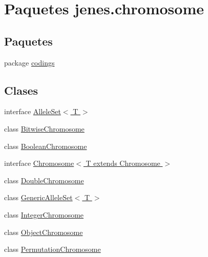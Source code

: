 \hypertarget{namespacejenes_1_1chromosome}{\section{Paquetes jenes.\-chromosome}
\label{namespacejenes_1_1chromosome}
}
\subsection*{Paquetes}
\begin{DoxyCompactItemize}
\item 
package \hyperlink{namespacejenes_1_1chromosome_1_1codings}{codings}
\end{DoxyCompactItemize}
\subsection*{Clases}
\begin{DoxyCompactItemize}
\item 
interface \hyperlink{interfacejenes_1_1chromosome_1_1_allele_set_3_01_t_01_4}{Allele\-Set$<$ T $>$}
\item 
class \hyperlink{classjenes_1_1chromosome_1_1_bitwise_chromosome}{Bitwise\-Chromosome}
\item 
class \hyperlink{classjenes_1_1chromosome_1_1_boolean_chromosome}{Boolean\-Chromosome}
\item 
interface \hyperlink{interfacejenes_1_1chromosome_1_1_chromosome_3_01_t_01extends_01_chromosome_01_4}{Chromosome$<$ T extends Chromosome $>$}
\item 
class \hyperlink{classjenes_1_1chromosome_1_1_double_chromosome}{Double\-Chromosome}
\item 
class \hyperlink{classjenes_1_1chromosome_1_1_generic_allele_set_3_01_t_01_4}{Generic\-Allele\-Set$<$ T $>$}
\item 
class \hyperlink{classjenes_1_1chromosome_1_1_integer_chromosome}{Integer\-Chromosome}
\item 
class \hyperlink{classjenes_1_1chromosome_1_1_object_chromosome}{Object\-Chromosome}
\item 
class \hyperlink{classjenes_1_1chromosome_1_1_permutation_chromosome}{Permutation\-Chromosome}
\end{DoxyCompactItemize}
